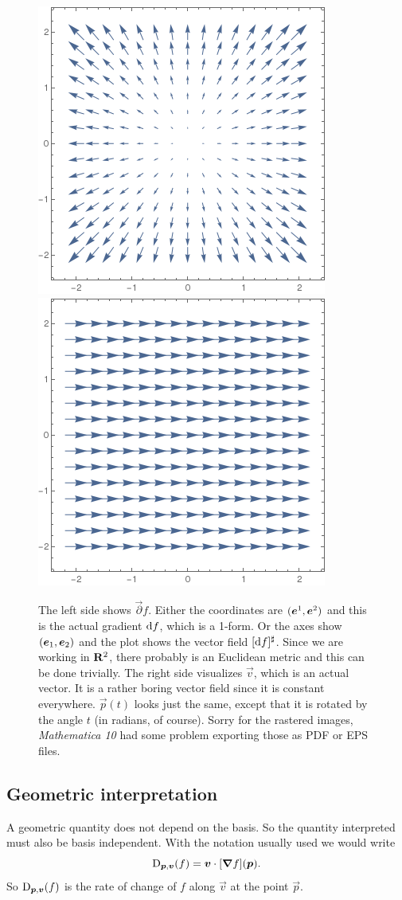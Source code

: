 \documentclass[11pt, english, fleqn, DIV=15, headinclude, BCOR=1cm]{scrartcl}
\begin{document}
\begin{figure}[htbp]
    \centering
    \includegraphics[width=.45\linewidth]{gradient.png}
    \hfill
    \includegraphics[width=.45\linewidth]{v.png}
    \caption{%
        The left side shows $\vec\partial f$. Either the coordinates are
        $(\boldsymbol{e}^1, \boldsymbol{e}^2)$ and this is the actual gradient $\mathop{}\!\mathrm d f$, which is a
        1-form. Or the axes show $(\boldsymbol{e}_1, \boldsymbol{e}_2)$ and the plot shows 
        the vector field $[\mathop{}\!\mathrm d f]^\sharp$. Since we are working in $\mathbf R^2$,
        there probably is an Euclidean metric and this can be done trivially.
        The right side visualizes $\vec v$, which is an actual vector. It is a
        rather boring vector field since it is constant everywhere. $\vec p(t)$
        looks just the same, except that it is rotated by the angle $t$ (in
        radians, of course).
        Sorry for the rastered images, \emph{Mathematica 10} had some problem
        exporting those as PDF or EPS files.
    }
    \label{fig:vector-fields}
\end{figure}

\subsection{Geometric interpretation}

A geometric quantity does not depend on the basis. So the quantity interpreted
must also be basis independent. With the notation usually used we would write
\[
    \mathop{}\!\mathrm D_{\boldsymbol{p}, \boldsymbol{v}}(f) = \boldsymbol{v} \cdot [\boldsymbol{\nabla} f](\boldsymbol{p}).
\]
So $\mathop{}\!\mathrm D_{\boldsymbol{p}, \boldsymbol{v}}(f)$ is the rate of change of $f$ along $\vec v$ at
the point $\vec p$.
\end{document}
